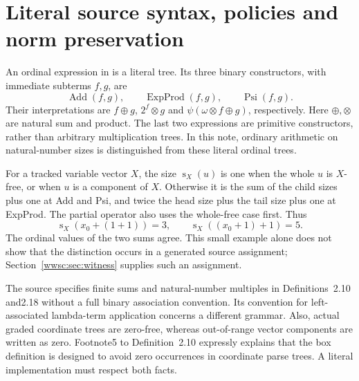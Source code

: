 \begingroup
\newcommand{\WWscNat}{\mathbb N}
\newcommand{\WWscLevel}{\operatorname{lv}}
\newcommand{\WWscNorm}{\operatorname{N}}
\newcommand{\WWscSize}{\operatorname{s}}
\newcommand{\WWscAdd}{\operatorname{Add}}
\newcommand{\WWscExp}{\operatorname{ExpProd}}
\newcommand{\WWscPsi}{\operatorname{Psi}}
\newcommand{\WWscRepeat}{\operatorname{Repeat}}
\newcommand{\WWscOne}{\mathbf1}
\newcommand{\WWscPartial}{\partial}
\section{Literal source syntax, policies and norm preservation}\label{app:wwsc}


An ordinal expression in \cite[Definition~2.1]{ww} is a literal tree. Its
three binary constructors, with immediate subterms $f,g$, are
\[
 \WWscAdd(f,g),\qquad \WWscExp(f,g),\qquad \WWscPsi(f,g).
\]
Their interpretations are $f\oplus g$, $2^f\otimes g$ and
$\psi(\omega\otimes f\oplus g)$, respectively. Here $\oplus,\otimes$
are natural sum and product. The last two expressions are primitive
constructors, rather than arbitrary multiplication trees. In this note,
ordinary arithmetic on natural-number sizes is distinguished from these
literal ordinal trees.

For a tracked variable vector $X$, the size $\WWscSize_X(u)$ is one when the
whole $u$ is $X$-free, or when $u$ is a component of $X$. Otherwise it is
the sum of the child sizes plus one at Add and Psi, and twice the head
size plus the tail size plus one at ExpProd. The partial operator also
uses the whole-free case first. Thus
\[
 \WWscSize_X(x_0+(1+1))=3,\qquad
 \WWscSize_X((x_0+1)+1)=5.
\]
The ordinal values of the two sums agree. This small example alone does
not show that the distinction occurs in a generated source assignment;
Section~\ref{wwsc:sec:witness} supplies such an assignment.

The source specifies finite sums and natural-number multiples in
Definitions~2.10 and2.18 without a full binary association convention.
Its convention for left-associated lambda-term application concerns a
different grammar. Also, actual graded coordinate trees are zero-free,
whereas out-of-range vector components are written as zero. Footnote5
to Definition~2.10 expressly explains that the box definition is designed
to avoid zero occurrences in coordinate parse trees. A literal
implementation must respect both facts.

